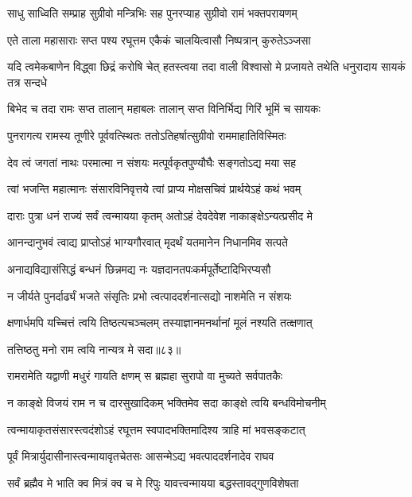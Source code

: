 \twolineshloka
{साधु साध्विति सम्प्राह सुग्रीवो मन्त्रिभिः सह}
{पुनरप्याह सुग्रीवो रामं भक्तपरायणम्} %

\twolineshloka
{एते ताला महासाराः सप्त पश्य रघूत्तम}
{एकैकं चालयित्वासौ निष्पत्रान् कुरुतेऽञ्जसा} %

\threelineshloka
{यदि त्वमेकबाणेन विद्ध्वा छिद्रं करोषि चेत्}
{हतस्त्वया तदा वाली विश्वासो मे प्रजायते}
{तथेति धनुरादाय सायकं तत्र सन्दधे} %

\twolineshloka
{बिभेद च तदा रामः सप्त तालान् महाबलः}
{तालान् सप्त विनिर्भिद्य गिरिं भूमिं च सायकः} %

\twolineshloka
{पुनरागत्य रामस्य तूणीरे पूर्ववत्स्थितः}
{ततोऽतिहर्षात्सुग्रीवो राममाहातिविस्मितः} %

\twolineshloka
{देव त्वं जगतां नाथः परमात्मा न संशयः}
{मत्पूर्वकृतपुण्यौघैः सङ्गतोऽद्य मया सह} %

\twolineshloka
{त्वां भजन्ति महात्मानः संसारविनिवृत्तये}
{त्वां प्राप्य मोक्षसचिवं प्रार्थयेऽहं कथं भवम्} %

\twolineshloka
{दाराः पुत्रा धनं राज्यं सर्वं त्वन्मायया कृतम्}
{अतोऽहं देवदेवेश नाकाङ्क्षेऽन्यत्प्रसीद मे} %

\twolineshloka
{आनन्दानुभवं त्वाद्य प्राप्तोऽहं भाग्यगौरवात्}
{मृदर्थं यतमानेन निधानमिव सत्पते} %

\twolineshloka
{अनाद्यविद्यासंसिद्धं बन्धनं छिन्नमद्य नः}
{यज्ञदानतपःकर्मपूर्तेष्टादिभिरप्यसौ} %

\twolineshloka
{न जीर्यते पुनर्दार्ढ्यं भजते संसृतिः प्रभो}
{त्वत्पाददर्शनात्सद्यो नाशमेति न संशयः} %

\twolineshloka
{क्षणार्धमपि यच्चित्तं त्वयि तिष्ठत्यचञ्चलम्}
{तस्याज्ञानमनर्थानां मूलं नश्यति तत्क्षणात्} %

{तत्तिष्ठतु मनो राम त्वयि नान्यत्र मे सदा॥८३॥} %


\twolineshloka
{रामरामेति यद्वाणी मधुरं गायति क्षणम्}
{स ब्रह्महा सुरापो वा मुच्यते सर्वपातकैः} %

\twolineshloka
{न काङ्क्षे विजयं राम न च दारसुखादिकम्}
{भक्तिमेव सदा काङ्क्षे त्वयि बन्धविमोचनीम्} %

\twolineshloka
{त्वन्मायाकृतसंसारस्त्वदंशोऽहं रघूत्तम}
{स्वपादभक्तिमादिश्य त्राहि मां भवसङ्कटात्} %

\twolineshloka
{पूर्वं मित्रार्युदासीनास्त्वन्मायावृतचेतसः}
{आसन्मेऽद्य भवत्पाददर्शनादेव राघव} %

\twolineshloka
{सर्वं ब्रह्मैव मे भाति क्व मित्रं क्व च मे रिपुः}
{यावत्त्वन्मायया बद्धस्तावद्गुणविशेषता} %

